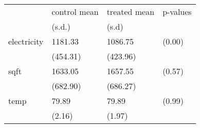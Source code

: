 \begin{tabular}{llll}
\toprule
{} & control mean & treated mean & p-values \\
{} &       (s.d.) & \multicolumn{2}{l}{(s.d)} \\
\midrule
electricity &      1181.33 &      1086.75 &   (0.00) \\
            &     (454.31) &     (423.96) &          \\
sqft        &      1633.05 &      1657.55 &   (0.57) \\
            &     (682.90) &     (686.27) &          \\
temp        &        79.89 &        79.89 &   (0.99) \\
            &       (2.16) &       (1.97) &          \\
\bottomrule
\end{tabular}
